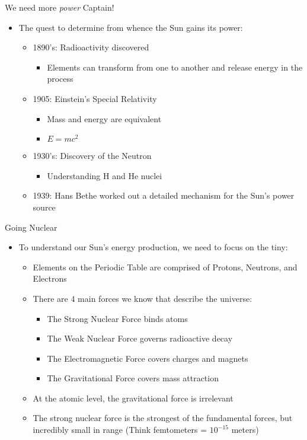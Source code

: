 \documentclass[pdf, aspectratio=169]{beamer}
\begin{document}
\begin{frame}{We need more \emph{power} Captain!}
  \begin{itemize}
	\item The quest to determine from whence the Sun gains its power:
	  \begin{itemize}
		\item 1890's: Radioactivity discovered
		  \begin{itemize}
			\item Elements can transform from one to another and release energy in the process
		  \end{itemize}
		\item 1905: Einstein's Special Relativity
		  \begin{itemize}
			\item Mass and energy are equivalent
			\item $E = mc^2$
		  \end{itemize}
		\item 1930's: Discovery of the Neutron
		  \begin{itemize}
			\item Understanding H and He nuclei
		  \end{itemize}
		\item 1939: Hans Bethe worked out a detailed mechanism for the Sun's power source
	  \end{itemize}
  \end{itemize}
\end{frame}

\begin{frame}{Going Nuclear}
  \begin{itemize}
	\item To understand our Sun's energy production, we need to focus on the tiny:
	  \begin{itemize}
		\item Elements on the Periodic Table are comprised of Protons, Neutrons, and Electrons
		\item There are 4 main forces we know that describe the universe:
		  \begin{itemize}
			\item The Strong Nuclear Force binds atoms
			\item The Weak Nuclear Force governs radioactive decay
			\item The Electromagnetic Force covers charges and magnets
			\item The Gravitational Force covers mass attraction
		  \end{itemize}
		\item At the atomic level, the gravitational force is irrelevant
		\item The strong nuclear force is the strongest of the fundamental forces, but incredibly small in range (Think femtometers = $10^{-15}$ meters)
	  \end{itemize}
  \end{itemize}
\end{frame}
\end{document}
